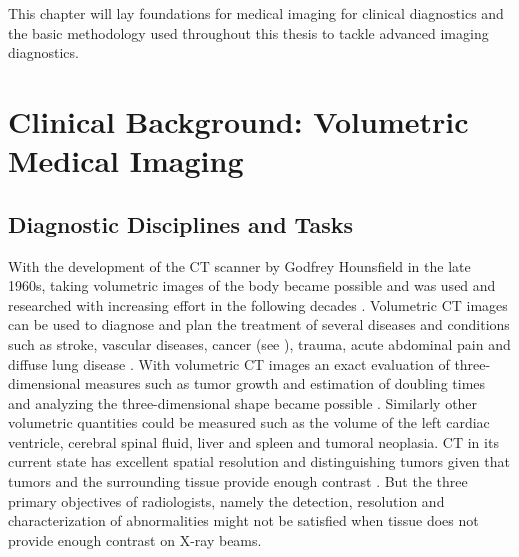 This chapter will lay foundations for medical imaging for clinical diagnostics and the basic methodology used throughout this thesis to tackle advanced imaging diagnostics.

\section{Clinical Background: Volumetric Medical Imaging} %


    \subsection{Diagnostic Disciplines and Tasks} %
        With the development of the CT scanner by Godfrey Hounsfield in the late 1960s, taking volumetric images of the body became possible and was used and researched with increasing effort in the following decades \citep{alexander2010emi, rubin2014computed}. Volumetric \ac{CT} images can be used to diagnose and plan the treatment of several diseases and conditions such as stroke, vascular diseases, cancer (see ), trauma, acute abdominal pain and diffuse lung disease \citep{rubin2014computed}. With volumetric \ac{CT} images an exact evaluation of  three-dimensional measures such as tumor growth and estimation
        of doubling times %
        and analyzing the three-dimensional shape became possible \citep{rubin2014computed}. Similarly other volumetric quantities could be measured such as the volume of the
        left cardiac ventricle,  %
        cerebral spinal fluid, %
        liver and spleen %
        and tumoral neoplasia. %
        CT in its current state has excellent spatial resolution and distinguishing tumors given that tumors and the surrounding tissue provide enough contrast \citep{abramson2023surgeons}.
        But the three primary objectives of radiologists, namely the detection, resolution and characterization of abnormalities \citep{abramson2023surgeons} might not be satisfied when tissue does not provide enough contrast on X-ray beams.

